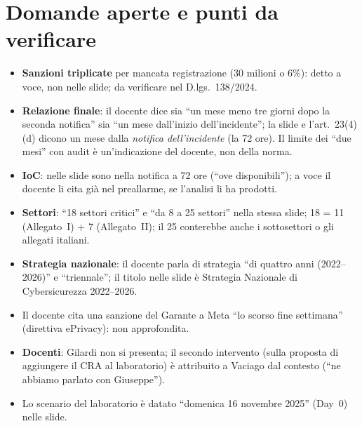 \section{Domande aperte e punti da verificare}
\begin{verifica}
\begin{itemize}
  \item \textbf{Sanzioni triplicate} per mancata registrazione (30 milioni o 6\%): detto a voce, non
    nelle slide; da verificare nel D.lgs.~138/2024.
  \item \textbf{Relazione finale}: il docente dice sia ``un mese meno tre giorni dopo la seconda
    notifica'' sia ``un mese dall'inizio dell'incidente''; la slide e l'art.~23(4)(d) dicono un mese
    dalla \emph{notifica dell'incidente} (la 72 ore). Il limite dei ``due mesi'' con audit è
    un'indicazione del docente, non della norma.
  \item \textbf{IoC}: nelle slide sono nella notifica a 72 ore (``ove disponibili''); a voce il docente
    li cita già nel preallarme, se l'analisi li ha prodotti.
  \item \textbf{Settori}: ``18 settori critici'' e ``da 8 a 25 settori'' nella stessa slide; 18 = 11
    (Allegato~I) + 7 (Allegato~II); il 25 conterebbe anche i sottosettori o gli allegati italiani.
  \item \textbf{Strategia nazionale}: il docente parla di strategia ``di quattro anni (2022--2026)'' e
    ``triennale''; il titolo nelle slide è Strategia Nazionale di Cybersicurezza 2022--2026.
  \item Il docente cita una sanzione del Garante a Meta ``lo scorso fine settimana'' (direttiva
    ePrivacy): non approfondita.
  \item \textbf{Docenti}: Gilardi non si presenta; il secondo intervento (sulla proposta di aggiungere il
    CRA al laboratorio) è attribuito a Vaciago dal contesto (``ne abbiamo parlato con Giuseppe'').
  \item Lo scenario del laboratorio è datato ``domenica 16 novembre 2025'' (Day~0) nelle slide.
\end{itemize}
\end{verifica}
